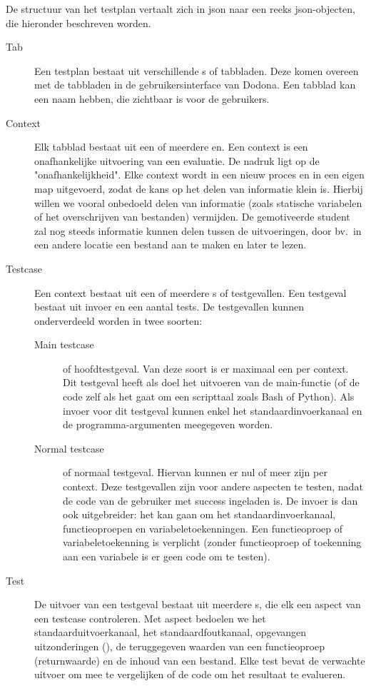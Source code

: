 De structuur van het testplan vertaalt zich in json naar een reeks json-objecten, die hieronder beschreven worden.

\begin{description}
    \item[Tab] Een testplan bestaat uit verschillende s of tabbladen.
    Deze komen overeen met de tabbladen in de gebruikersinterface van Dodona.
    Een tabblad kan een naam hebben, die zichtbaar is voor de gebruikers.
    \item[Context] Elk tabblad bestaat uit een of meerdere en.
    Een context is een onafhankelijke uitvoering van een evaluatie.
    De nadruk ligt op de "onafhankelijkheid".
    Elke context wordt in een nieuw proces en in een eigen map uitgevoerd, zodat de kans op het delen van informatie klein is.
    Hierbij willen we vooral onbedoeld delen van informatie (zoals statische variabelen of het overschrijven van bestanden) vermijden.
    De gemotiveerde student zal nog steeds informatie kunnen delen tussen de uitvoeringen, door bv.\ in een andere locatie een bestand aan te maken en later te lezen.
    \item[Testcase] Een context bestaat uit een of meerdere s of testgevallen.
    Een testgeval bestaat uit invoer en een aantal tests.
    De testgevallen kunnen onderverdeeld worden in twee soorten:
    \begin{description}
        \item[Main testcase] of hoofdtestgeval.
        Van deze soort is er maximaal een per context.
        Dit testgeval heeft als doel het uitvoeren van de main-functie (of de code zelf als het gaat om een scripttaal zoals Bash of Python).
        Als invoer voor dit testgeval kunnen enkel het standaardinvoerkanaal en de programma-argumenten meegegeven worden.
        \item[Normal testcase] of normaal testgeval.
        Hiervan kunnen er nul of meer zijn per context.
        Deze testgevallen zijn voor andere aspecten te testen, nadat de code van de gebruiker met success ingeladen is.
        De invoer is dan ook uitgebreider: het kan gaan om het standaardinvoerkanaal, functieoproepen en variabeletoekenningen.
        Een functieoproep of variabeletoekenning is verplicht (zonder functieoproep of toekenning aan een variabele is er geen code om te testen).
    \end{description}
    \item[Test] De uitvoer van een testgeval bestaat uit meerdere s, die elk een aspect van een testcase controleren.
    Met aspect bedoelen we het standaarduitvoerkanaal, het standaardfoutkanaal, opgevangen uitzonderingen (), de teruggegeven waarden van een functieoproep (returnwaarde) en de inhoud van een bestand.
    Elke test bevat de verwachte uitvoer om mee te vergelijken of de code om het resultaat te evalueren.
\end{description}

